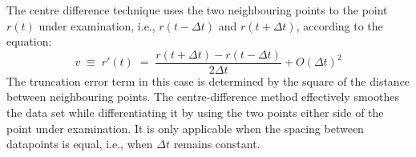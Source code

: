 \documentclass[namedreferences]{SolarPhysics}
\begin{document}
\begin{article}
The centre difference technique uses the two neighbouring points to the point $r(t)$ under examination, i.e., $r(t - \Delta t)$ and $r(t + \Delta t)$, according to the equation:
\begin{equation}
\label{eqn_centre}
v \; \equiv \; r'(t) \; = \; \frac{r(t + \Delta t) - r(t - \Delta t)}{2 \Delta t} + O(\Delta t)^{2}
\end{equation}
The truncation error term in this case is determined by the square of the distance between neighbouring points.%
The centre-difference method effectively smoothes the data set while differentiating it by using the two points either side of the point under examination. It is only applicable when the spacing between datapoints is equal, i.e., when $\Delta t$ remains constant. %
 


\end{article}
\end{document}
